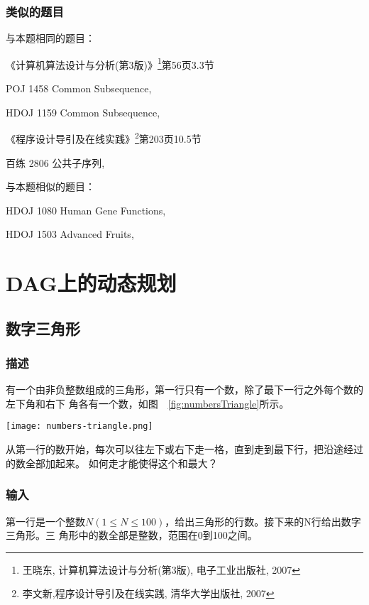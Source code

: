 \subsubsection{类似的题目}
与本题相同的题目：
\begindot
\item 《计算机算法设计与分析(第3版)》\footnote{王晓东, 计算机算法设计与分析(第3版), 电子工业出版社, 2007}第56页3.3节
\item POJ 1458 Common Subsequence, 
\item HDOJ 1159 Common Subsequence, 
\item 《程序设计导引及在线实践》\footnote{李文新,程序设计导引及在线实践, 清华大学出版社, 2007}第203页10.5节
\item 百练 2806 公共子序列, 
\myenddot

与本题相似的题目：
\begindot
\item HDOJ 1080 Human Gene Functions, 
\item HDOJ 1503 Advanced Fruits, 
\myenddot

\section{DAG上的动态规划} %

\subsection{数字三角形}

\subsubsection{描述}
有一个由非负整数组成的三角形，第一行只有一个数，除了最下一行之外每个数的左下角和右下
角各有一个数，如图~~\ref{fig:numbersTriangle}所示。

\begin{center}
\texttt{[image: numbers-triangle.png]}\\
\label{fig:numbersTriangle}
\end{center}

从第一行的数开始，每次可以往左下或右下走一格，直到走到最下行，把沿途经过的数全部加起来。
如何走才能使得这个和最大？

\subsubsection{输入}
第一行是一个整数$N (1 \le N \leq 100)$，给出三角形的行数。接下来的N行给出数字三角形。三
角形中的数全部是整数，范围在0到100之间。

